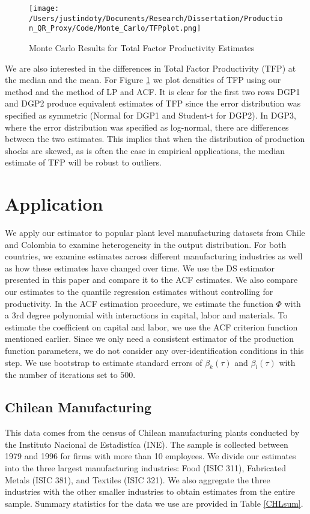 \documentclass[11pt]{article}
\begin{document}
\begin{figure}[H]
\centering
\caption{Monte Carlo Results for Total Factor Productivity Estimates}
\texttt{[image: /Users/justindoty/Documents/Research/Dissertation/Production\_QR\_Proxy/Code/Monte\_Carlo/TFPplot.png]}
\label{fig:MCTFP}
\end{figure}

We are also interested in the differences in Total Factor Productivity (TFP) at the median and the mean. For Figure \ref{fig:MCTFP} we plot densities of TFP using our method and the method of LP and ACF. It is clear for the first two rows DGP1 and DGP2 produce equivalent estimates of TFP since the error distribution was specified as symmetric (Normal for DGP1 and Student-t for DGP2). In DGP3, where the error distribution was specified as log-normal, there are differences between the two estimates. This implies that when the distribution of production shocks are skewed, as is often the case in empirical applications, the median estimate of TFP will be robust to outliers. 

\section{Application} \label{application}
We apply our estimator to popular plant level manufacturing datasets from Chile and Colombia to examine heterogeneity in the output distribution. For both countries, we examine estimates across different manufacturing industries as well as how these estimates have changed over time. We use the DS estimator presented in this paper and compare it to the ACF estimates. We also compare our estimates to the quantile regression estimates without controlling for productivity. In the ACF estimation procedure, we estimate the function $\Phi$ with a 3rd degree polynomial with interactions in capital, labor and materials. To estimate the coefficient on capital and labor, we use the ACF criterion function mentioned earlier. Since we only need a consistent estimator of the production function parameters, we do not consider any over-identification conditions in this step. We use bootstrap to estimate standard errors of $\beta_{k}(\tau)$ and $\beta_{l}(\tau)$ with the number of iterations set to $500$.

\subsection{Chilean Manufacturing}
This data comes from the census of Chilean manufacturing plants conducted by the Instituto Nacional de Estadist\'ica (INE). The sample is collected between 1979 and 1996 for firms with more than 10 employees. We divide our estimates into the three largest manufacturing industries: Food (ISIC 311), Fabricated Metals (ISIC 381), and Textiles (ISIC 321). We also aggregate the three industries with the other smaller industries to obtain estimates from the entire sample. Summary statistics for the data we use are provided in Table \ref{CHLsum}.
\end{document}
